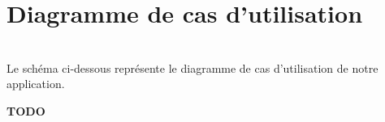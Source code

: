 \documentclass[10pt]{report}
\begin{document}
\section{Diagramme de cas d'utilisation}
~\\
Le schéma ci-dessous représente le diagramme de cas d'utilisation de notre application. \\
	\begin{figure}[hp]
	      \begin{center}
	      \end{center}
	\end{figure}
\textbf{TODO}

\newpage
\end{document}
